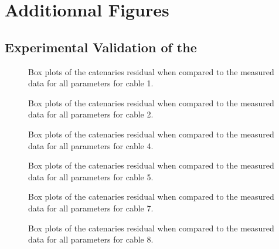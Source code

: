 \chapter{Additionnal Figures}
\label{additionnal_figures}

\minitoc{}

\newpage{}

\section{Experimental Validation of the \augmentedmodeltitle{}}
\label{af_rtdtecxperimental_validation_of_the_augmented_catenary_model}

\begin{figure}[H]
	\centering
	\caption{
		Box plots of the catenaries residual when compared to the measured data for all parameters for
		cable 1.
	}
	\label{af_rtdtecvotacm_cable_1_boxplot}
\end{figure}
\begin{figure}[H]
	\centering
	\caption{
		Box plots of the catenaries residual when compared to the measured data for all parameters for
		cable 2.
	}
	\label{af_rtdtecvotacm_cable_2_boxplot}
\end{figure}
\begin{figure}[H]
	\centering
	\caption{
		Box plots of the catenaries residual when compared to the measured data for all parameters for
		cable 4.
	}
	\label{af_rtdtecvotacm_cable_4_boxplot}
\end{figure}
\begin{figure}[H]
	\centering
	\caption{
		Box plots of the catenaries residual when compared to the measured data for all parameters for
		cable 5.
	}
	\label{af_rtdtecvotacm_cable_5_boxplot}
\end{figure}
\begin{figure}[H]
	\centering
	\caption{
		Box plots of the catenaries residual when compared to the measured data for all parameters for
		cable 7.
	}
	\label{af_rtdtecvotacm_cable_7_boxplot}
\end{figure}
\begin{figure}[H]
	\centering
	\caption{
		Box plots of the catenaries residual when compared to the measured data for all parameters for
		cable 8.
	}
	\label{af_rtdtecvotacm_cable_8_boxplot}
\end{figure}

